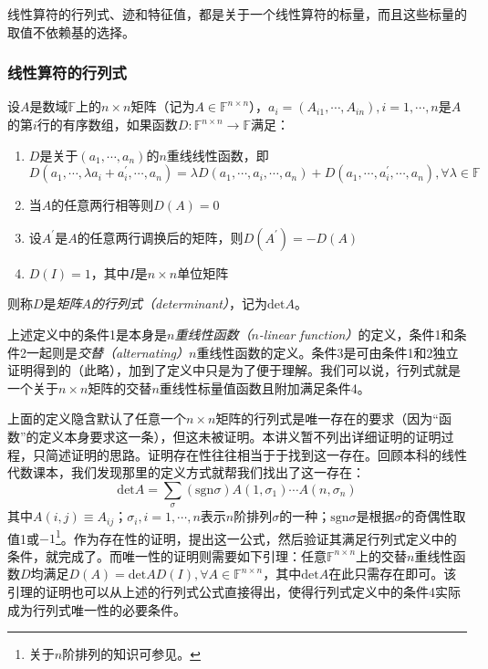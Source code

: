 \documentclass[main.tex]{subfiles}
\begin{document}
线性算符的行列式、迹和特征值，都是关于一个线性算符的标量，而且这些标量的取值不依赖基的选择。
\subsubsection{线性算符的行列式}
\begin{definition}\label{def:II.2.17}
    设$A$是数域$\mathbb{F}$上的$n\times n$矩阵（记为$A\in\mathbb{F}^{n\times n}$），$a_i=\left(A_{i1},\cdots,A_{in}\right),i=1,\cdots,n$是$A$的第$i$行的有序数组，如果函数$D:\mathbb{F}^{n\times n}\rightarrow\mathbb{F}$满足：
    \begin{enumerate}
        \item $D$是关于$\left(a_1,\cdots,a_n\right)$的$n$重线线性函数，即
              \[
                  D\left(a_1,\cdots,\lambda a_i+a^\prime_i,\cdots,a_n\right)=\lambda D\left(a_1,\cdots,a_i,\cdots,a_n\right)+D\left(a_1,\cdots,a^\prime_i,\cdots,a_n\right),\forall\lambda\in\mathbb{F}
              \]
        \item 当$A$的任意两行相等则$D\left(A\right)=0$
        \item 设$A^\prime$是$A$的任意两行调换后的矩阵，则$D\left(A^\prime\right)=-D\left(A\right)$
        \item $D\left(I\right)=1$，其中$I$是$n\times n$单位矩阵
    \end{enumerate}
    则称$D$是\emph{矩阵$A$的行列式（determinant）}，记为$\mathrm{det}A$。
\end{definition}
上述定义中的条件1是本身是\emph{$n$重线性函数（$n$-linear function）}的定义，条件1和条件2一起则是\emph{交替（alternating）}$n$重线性函数的定义。条件3是可由条件1和2独立证明得到的（此略\cite[\S 5.2]{Hoffman1971}），加到了定义中只是为了便于理解。我们可以说，行列式就是一个关于$n\times n$矩阵的交替$n$重线性标量值函数且附加满足条件4。

上面的定义隐含默认了任意一个$n\times n$矩阵的行列式是唯一存在的要求（因为“函数”的定义本身要求这一条），但这未被证明。本讲义暂不列出详细证明的证明过程，只简述证明的思路。证明存在性往往相当于于找到这一存在。回顾本科的线性代数课本，我们发现那里的定义方式\cite[\S 1.3 定义3.1]{周胜林2012线性代数}就帮我们找出了这一存在：
\[
    \mathrm{det}A=\sum_{\sigma}\left(\mathrm{sgn}\sigma\right)A\left(1,\sigma_1\right)\cdots A\left(n,\sigma_n\right)
\]
其中$A\left(i,j\right)\equiv A_{ij}$；$\sigma_i,i=1,\cdots,n$表示$n$阶排列$\sigma$的一种；$\mathrm{sgn}\sigma$是根据$\sigma$的奇偶性取值1或$-1$\footnote{关于$n$阶排列的知识可参见\cite[\S1.2]{周胜林2012线性代数}。}。作为存在性的证明，提出这一公式，然后验证其满足行列式定义中的条件，就完成了。而唯一性的证明则需要如下引理：任意$\mathbb{F}^{n\times n}$上的交替$n$重线性函数$D$均满足$D\left(A\right)=\mathrm{det}AD\left(I\right),\forall A\in\mathbb{F}^{n\times n}$，其中$\mathrm{det}A$在此只需存在即可。该引理的证明也可以从上述的行列式公式直接得出，使得行列式定义中的条件4实际成为行列式唯一性的必要条件。
\end{document}
